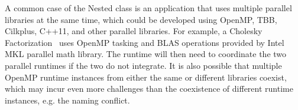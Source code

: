 A common case of the Nested class is an application that uses multiple parallel libraries at the same time, which could be developed 
using OpenMP, TBB, Cilkplus, C++11, and other parallel libraries. 
For example, a Cholesky Factorization~\cite{intertwine} %
uses OpenMP tasking and BLAS operations provided by Intel MKL parallel math library.
The runtime will then need to coordinate the two
parallel runtimes if the two do not integrate. %
It is also possible that multiple OpenMP runtime instances from either the same or different libraries coexist, which
may incur even more challenges than the coexistence of different runtime instances, e.g. the naming conflict. 

